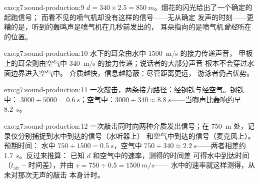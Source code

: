 \begin{solution}{exo:g7:sound-production:9}
$d = 340 \times 2.5 = \qty{850}{m}$。烟花的闪光给出了一个确定的起跑信号；
而看不见的喷气机却没有这样的信号——无从确定
发声的时刻——更糟的是，听到的轰鸣声是喷气机在几秒前发出的，
耳朵指向的是喷气机\emph{曾经}所在的位置。
\end{solution}

\begin{solution}{exo:g7:sound-production:10}
水下的耳朵由水中 \qty{1500}{m/s} 的接力传递声音，
甲板上的耳朵则由空气中 \qty{340}{m/s} 的接力传递；说话者的大部分声音
根本不会穿过水面边界进入空气中。
介质越快，信息越隐蔽：尽管距离更远，
游泳者仍占优势。
\end{solution}

\begin{solution}{exo:g7:sound-production:11}
一次敲击，两条接力路径：经钢铁与经空气。钢铁中：
$3000 \div 5000 = \qty{0.6}{s}$；空气中：$3000 \div 340 \approx
\qty{8.8}{s}$——当啷声比轰响约早
\qty{8.2}{s}。
\end{solution}

\begin{solution}{exo:g7:sound-production:12}
一次敲击同时向两种介质发出信号；在
\qty{750}{m} 处，记录仪分别捕捉到水中到达的信号（水听器上）
和空气中到达的信号（麦克风上）。预期时间：
水中 $750 \div 1500 = \qty{0.5}{s}$，空气中 $750 \div 340
\approx \qty{2.2}{s}$——两者相差约 \qty{1.7}{s}。反过来推算：
已知 $d$ 和空气中的速率，测得的时间差
可得水中到达时间（$t_{\text{air}} -
\text{时间差}$），并由 $v = 750 \div 0.5 = \qty{1500}{m/s}$——
水中的速率就这样测得，从未对那次无声的敲击
本身计时。
\end{solution}

